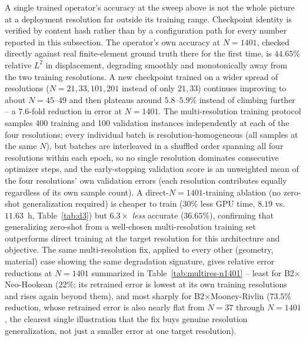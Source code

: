 \documentclass[final,5p,times]{elsarticle}
\begin{document}
A single trained operator's accuracy at the sweep above is not the whole
picture at a deployment resolution far outside its training range.
Checkpoint identity is verified by content hash rather than by a
configuration path for every number reported in this subsection. The
operator's own accuracy at $N{=}1401$, checked directly against real finite-element
ground truth there for the first time, is $44.65\%$ relative $L^2$ in
displacement, degrading smoothly and monotonically away from the two
training resolutions. A new checkpoint trained on a wider spread of
resolutions ($N=21,33,101,201$ instead of only $21,33$) continues
improving to about $N{=}45$--$49$ and then plateaus around $5.8$--$5.9\%$
instead of climbing further -- a $7.6$-fold reduction in error at
$N{=}1401$. The multi-resolution training protocol samples 400 training
and 100 validation instances independently at each of the four
resolutions; every individual batch is resolution-homogeneous (all
samples at the same $N$), but batches are interleaved in a shuffled order
spanning all four resolutions within each epoch, so no single resolution
dominates consecutive optimizer steps, and the early-stopping validation
score is an unweighted mean of the four resolutions' own validation
errors (each resolution contributes equally regardless of its own sample
count). A direct-$N{=}1401$-training ablation (no zero-shot
generalization required) is cheaper to train ($30\%$ less GPU time,
$8.19$ vs.\ $11.63$~h, Table~\ref{tab:d3}) but
$6.3\times$ \emph{less} accurate ($36.65\%$), confirming that generalizing
zero-shot from a well-chosen multi-resolution training set outperforms
direct training at the target resolution for this architecture and
objective. The same multi-resolution fix, applied to every other
(geometry, material) case showing the same degradation signature, gives
relative error reductions at $N{=}1401$ summarized in
Table~\ref{tab:multires-n1401} -- least for B2$\times$Neo-Hookean
($22\%$; its retrained error is lowest at its own training resolutions
and rises again beyond them), and most sharply for B2$\times$Mooney-Rivlin
($73.5\%$ reduction, whose retrained error is also nearly flat from
$N{=}37$ through $N{=}1401$, the clearest single illustration that the fix
buys genuine resolution generalization, not just a smaller error at one
target resolution).
\end{document}

